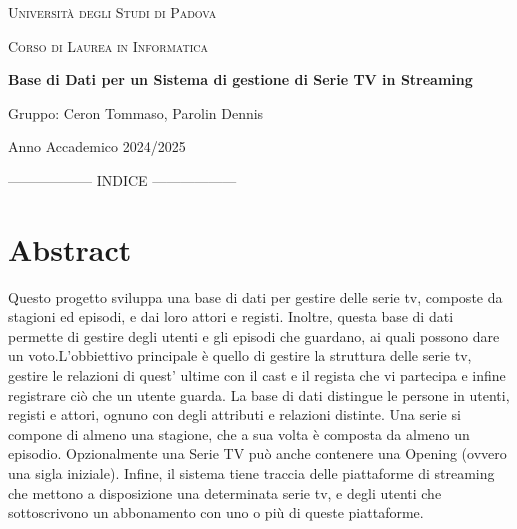 \documentclass[12pt,a4paper]{article}
\begin{document}
\begin{titlepage}
    \centering
    {\scshape\LARGE Università degli Studi di Padova \par}
    \vspace{1cm}
    {\scshape\Large Corso di Laurea in Informatica \par}
    \vspace{3cm}
    {\Huge\bfseries Base di Dati per un Sistema di gestione di Serie TV in Streaming \par}
    \vspace{2cm}
    {\Large Gruppo: Ceron Tommaso, Parolin Dennis\par}
    \vfill
    {\large Anno Accademico 2024/2025\par}
\end{titlepage}

------------------ INDICE  ------------------
\tableofcontents
\newpage


\section{Abstract}
Questo progetto sviluppa una base di dati per gestire delle serie tv, composte da stagioni ed episodi, e dai loro attori e registi. Inoltre, questa base di dati permette di gestire degli utenti e gli episodi che guardano, ai quali possono dare un voto.\newline L'obbiettivo principale è quello di gestire la struttura delle serie tv, gestire le relazioni di quest’ ultime con il cast e il regista che vi partecipa e infine registrare ciò che un utente guarda.\newline
La base di dati distingue le persone in utenti, registi e attori, ognuno con degli attributi e relazioni distinte.\newline
Una serie si compone di almeno una stagione, che a sua volta è composta da almeno un episodio. Opzionalmente una Serie TV può anche contenere una Opening (ovvero una sigla iniziale).\newline
Infine, il sistema tiene traccia delle piattaforme di streaming che mettono a disposizione una determinata serie tv, e degli utenti che sottoscrivono un abbonamento con uno o più di queste piattaforme. \newline
\end{document}
